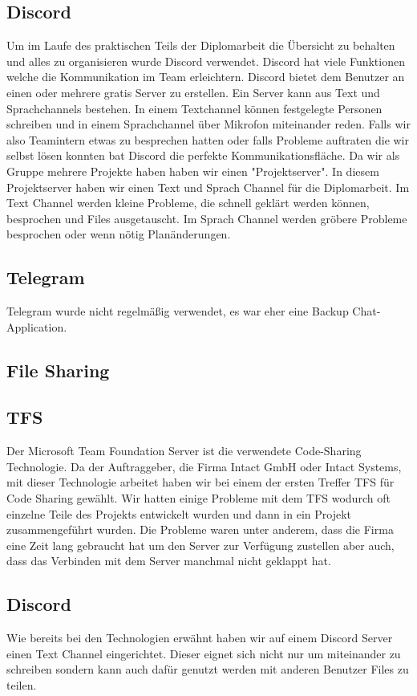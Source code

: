 \subsection {Discord}
\label{sec:Discord}
Um im Laufe des praktischen Teils der Diplomarbeit die Übersicht zu behalten und alles zu organisieren wurde Discord verwendet. Discord hat viele Funktionen welche die Kommunikation im Team erleichtern. Discord bietet dem Benutzer an einen oder mehrere gratis Server zu erstellen. Ein Server kann aus Text und Sprachchannels bestehen. In einem Textchannel können festgelegte Personen schreiben und in einem Sprachchannel über Mikrofon miteinander reden. Falls wir also Teamintern etwas zu besprechen hatten oder falls Probleme auftraten die wir selbst lösen konnten bat Discord die perfekte Kommunikationsfläche. 
Da wir als Gruppe mehrere Projekte haben haben wir einen "Projektserver". In diesem Projektserver haben wir einen Text und Sprach Channel für die Diplomarbeit. Im Text Channel werden kleine Probleme, die schnell geklärt werden können, besprochen und Files ausgetauscht. Im Sprach Channel werden gröbere Probleme besprochen oder wenn nötig Planänderungen. 
\subsection {Telegram}
\label{sec:Telegram}
Telegram wurde nicht regelmäßig verwendet, es war eher eine Backup Chat-Application. 
\subsection{File Sharing}
\label{sec:FileSharing}
\subsection {TFS}
\label{sec:TFS}
Der Microsoft Team Foundation Server ist die verwendete Code-Sharing Technologie. Da der Auftraggeber, die Firma Intact GmbH oder Intact Systems, mit dieser Technologie arbeitet haben wir bei einem der ersten Treffer TFS für Code Sharing gewählt. Wir hatten einige Probleme mit dem TFS wodurch oft einzelne Teile des Projekts entwickelt wurden und dann in ein Projekt zusammengeführt wurden. Die Probleme waren unter anderem, dass die Firma eine Zeit lang gebraucht hat um den Server zur Verfügung zustellen aber auch, dass das Verbinden mit dem Server manchmal nicht geklappt hat. 
\subsection {Discord}
\label{sec:Discord}
Wie bereits bei den Technologien erwähnt haben wir auf einem Discord Server einen Text Channel eingerichtet. Dieser eignet sich nicht nur um miteinander zu schreiben sondern kann auch dafür genutzt werden mit anderen Benutzer Files zu teilen. 
